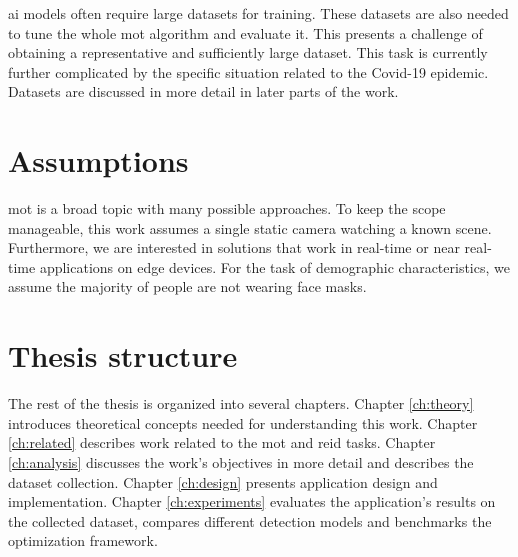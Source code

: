 \Gls{ai} models often require large datasets for training. These datasets are also needed to tune the whole \gls{mot} algorithm and evaluate it. This presents a challenge of obtaining a representative and sufficiently large dataset. This task is currently further complicated by the specific situation related to the Covid-19 epidemic. Datasets are discussed in more detail in later parts of the work.


\section*{Assumptions}

\Gls{mot} is a broad topic with many possible approaches. To keep the scope manageable, this work assumes a single static camera watching a known scene. Furthermore, we are interested in solutions that work in real-time or near real-time applications  on edge devices. For the task of demographic characteristics, we assume the majority of people are not wearing face masks. 

\section*{Thesis structure}

The rest of the thesis is organized into several chapters. Chapter \ref{ch:theory} introduces theoretical concepts needed for understanding this work. Chapter \ref{ch:related} describes work related to the \gls{mot} and \gls{reid} tasks. Chapter \ref{ch:analysis} discusses the work's objectives in more detail and describes the dataset collection. Chapter \ref{ch:design} presents application design and implementation. Chapter \ref{ch:experiments} evaluates the application's results on the collected dataset, compares different detection models and benchmarks the optimization framework.

